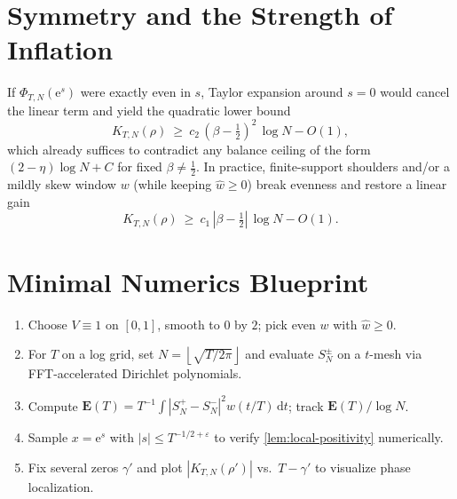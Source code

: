 \documentclass[11pt]{article}
\newcommand{\EE}{\mathbf{E}}
\newcommand{\e}{\mathrm{e}}
\newcommand{\dd}{\mathrm{d}}
\newcommand{\abs}[1]{\left\lvert #1 \right\rvert}
\newcommand{\floor}[1]{\left\lfloor #1 \right\rfloor}
\newcommand{\widehatw}{\widehat{w}}
\begin{document}
\section{Symmetry and the Strength of Inflation} \label{app:symmetry}
If $\Phi_{T,N}(\e^s)$ were exactly even in $s$, Taylor expansion around $s=0$ would cancel the linear term and yield the quadratic lower bound
\[
K_{T,N}(\rho)\ \ge\ c_2\,(\beta-\tfrac12)^2\,\log N - O(1),
\]
which already suffices to contradict any balance ceiling of the form $(2-\eta)\log N+C$ for fixed $\beta\ne\tfrac12$. In practice, finite-support shoulders and/or a mildly skew window $w$ (while keeping $\widehatw\ge0$) break evenness and restore a linear gain
\[
K_{T,N}(\rho)\ \ge\ c_1\,\abs{\beta-\tfrac12}\,\log N - O(1).
\]

\section{Minimal Numerics Blueprint} \label{app:numerics}
\begin{enumerate}[leftmargin=2.25em]
  \item Choose $V\equiv1$ on $[0,1]$, smooth to $0$ by $2$; pick even $w$ with $\widehatw\ge0$.
  \item For $T$ on a log grid, set $N=\floor{\sqrt{T/2\pi}}$ and evaluate $S_N^\pm$ on a $t$-mesh via FFT-accelerated Dirichlet polynomials.
  \item Compute $\EE(T)=T^{-1}\int \abs{S_N^+-S_N^-}^2 w(t/T)\,\dd t$; track $\EE(T)/\log N$.
  \item Sample $x=\e^s$ with $\abs{s}\le T^{-1/2+\varepsilon}$ to verify \cref{lem:local-positivity} numerically.
  \item Fix several zeros $\gamma'$ and plot $\abs{K_{T,N}(\rho')}$ vs.~$T-\gamma'$ to visualize phase localization.
\end{enumerate}
\nocite{*}


\end{document}
